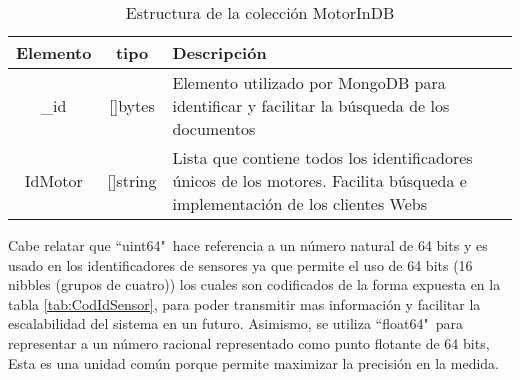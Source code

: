 \vspace{1cm}


    \begin{table}[ht]
        \begin{center}
        \caption[Estructura de MotorInDB]{Estructura de la colección MotorInDB}
        \label{tab:MotorInDBbson}
            \vspace{0.3cm}
            \begin{tabular}{|c|c|p{11cm}|}
                \hline
                Elemento & tipo     & Descripción \\\hline\hline
                \_id      & []bytes  & Elemento utilizado por MongoDB para
                identificar y facilitar la búsqueda de los documentos\\\hline
                IdMotor  & []string & Lista que contiene todos los identificadores
                únicos de los motores. Facilita búsqueda e implementación de los
                clientes Webs\\\hline
            \end{tabular}
        \end{center}
    \end{table}

    Cabe relatar que ``uint64"\  hace referencia a un número natural de 64 bits
    y es usado en los identificadores de sensores ya que permite el uso de 64
    bits (16 nibbles (grupos de cuatro)) los cuales son codificados de
    la forma expuesta en la tabla \ref{tab:CodIdSensor}, para
    poder transmitir mas información y facilitar la escalabilidad del sistema en
    un futuro.
    Asimismo, se utiliza
    ``float64"\ para representar  a un número racional representado como punto
    flotante de 64 bits, Esta es una unidad común porque permite maximizar la
    precisión en la medida.

